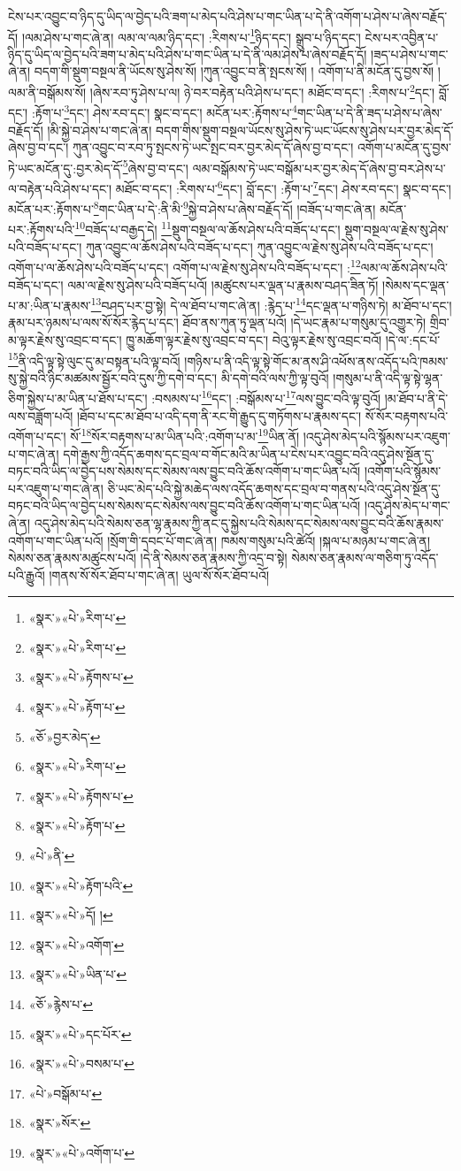 ངེས་པར་འབྱུང་བ་ཉིད་དུ་ཡིད་ལ་བྱེད་པའི་ཟག་པ་མེད་པའི་ཤེས་པ་གང་ཡིན་པ་དེ་ནི་འགོག་པ་ཤེས་པ་ཞེས་བརྗོད་དོ། །ལམ་ཤེས་པ་གང་ཞེ་ན། ལམ་ལ་ལམ་ཉིད་དང་། :རིགས་པ་\footnote{«སྣར་»«པེ་»རིག་པ་}ཉིད་དང་། སྒྲུབ་པ་ཉིད་དང་། ངེས་པར་འབྱིན་པ་ཉིད་དུ་ཡིད་ལ་བྱེད་པའི་ཟག་པ་མེད་པའི་ཤེས་པ་གང་ཡིན་པ་དེ་ནི་ལམ་ཤེས་པ་ཞེས་བརྗོད་དོ། །ཟད་པ་ཤེས་པ་གང་ཞེ་ན། བདག་གི་སྡུག་བསྔལ་ནི་ཡོངས་སུ་ཤེས་སོ། །ཀུན་འབྱུང་བ་ནི་སྤངས་སོ། །
འགོག་པ་ནི་མངོན་དུ་བྱས་སོ། །ལམ་ནི་བསྒོམས་སོ། །ཞེས་རབ་ཏུ་ཤེས་པ་ལ། ཉེ་བར་བརྟེན་པའི་ཤེས་པ་དང་། མཐོང་བ་དང་། :རིགས་པ་\footnote{«སྣར་»«པེ་»རིག་པ་}དང་། བློ་དང་། :རྟོག་པ་\footnote{«སྣར་»«པེ་»རྟོགས་པ་}དང་། ཤེས་རབ་དང་། སྣང་བ་དང་། མངོན་པར་:རྟོགས་པ་\footnote{«སྣར་»«པེ་»རྟོག་པ་}གང་ཡིན་པ་དེ་ནི་ཟད་པ་ཤེས་པ་ཞེས་བརྗོད་དོ། །མི་སྐྱེ་བ་ཤེས་པ་གང་ཞེ་ན། བདག་གིས་སྡུག་བསྔལ་ཡོངས་སུ་ཤེས་ཏེ་ཡང་ཡོངས་སུ་ཤེས་པར་བྱར་མེད་དོ་ཞེས་བྱ་བ་དང་། ཀུན་འབྱུང་བ་རབ་ཏུ་སྤངས་ཏེ་ཡང་སྤང་བར་བྱར་མེད་དོ་ཞེས་བྱ་བ་དང་། འགོག་པ་མངོན་དུ་བྱས་ཏེ་ཡང་མངོན་དུ་:བྱར་མེད་དོ་\footnote{«ཅོ་»བྱར་མེད་}ཞེས་བྱ་བ་དང་། ལམ་བསྒོམས་ཏེ་ཡང་བསྒོམ་པར་བྱར་མེད་དོ་ཞེས་བྱ་བར་ཤེས་པ་ལ་བརྟེན་པའི་ཤེས་པ་དང་། མཐོང་བ་དང་། :རིགས་པ་\footnote{«སྣར་»«པེ་»རིག་པ་}དང་། བློ་དང་། :རྟོག་པ་\footnote{«སྣར་»«པེ་»རྟོགས་པ་}དང་། ཤེས་རབ་དང་། སྣང་བ་དང་། མངོན་པར་:རྟོགས་པ་\footnote{«སྣར་»«པེ་»རྟོག་པ་}གང་ཡིན་པ་དེ་:ནི་མི་\footnote{«པེ་»ནི་}སྐྱེ་བ་ཤེས་པ་ཞེས་བརྗོད་དོ། །བཟོད་པ་གང་ཞེ་ན། མངོན་པར་:རྟོགས་པའི་\footnote{«སྣར་»«པེ་»རྟོག་པའི་}བཟོད་པ་བརྒྱད་དེ། \footnote{«སྣར་»«པེ་»དོ། ། }སྡུག་བསྔལ་ལ་ཆོས་ཤེས་པའི་བཟོད་པ་དང་། སྡུག་བསྔལ་ལ་རྗེས་སུ་ཤེས་པའི་བཟོད་པ་དང་། ཀུན་འབྱུང་ལ་ཆོས་ཤེས་པའི་བཟོད་པ་དང་། ཀུན་འབྱུང་ལ་རྗེས་སུ་ཤེས་པའི་བཟོད་པ་དང་། འགོག་པ་ལ་ཆོས་ཤེས་པའི་བཟོད་པ་དང་། འགོག་པ་ལ་རྗེས་སུ་ཤེས་པའི་བཟོད་པ་དང་། :\footnote{«སྣར་»«པེ་»འགོག་}ལམ་ལ་ཆོས་ཤེས་པའི་བཟོད་པ་དང་། ལམ་ལ་རྗེས་སུ་ཤེས་པའི་བཟོད་པའོ། །མཚུངས་པར་ལྡན་པ་རྣམས་བཤད་ཟིན་ཏོ། །སེམས་དང་ལྡན་པ་མ་:ཡིན་པ་རྣམས་\footnote{«སྣར་»«པེ་»ཡིན་པ་}བཤད་པར་བྱ་སྟེ། དེ་ལ་ཐོབ་པ་གང་ཞེ་ན། :རྙེད་པ་\footnote{«ཅོ་»རྙེས་པ་}དང་ལྡན་པ་གཉིས་ཏེ། མ་ཐོབ་པ་དང་། རྣམ་པར་ཉམས་པ་ལས་སོ་སོར་རྙེད་པ་དང་། ཐོབ་ནས་ཀུན་ཏུ་ལྡན་པའོ། །དེ་ཡང་རྣམ་པ་གསུམ་དུ་འགྱུར་ཏེ། གྲིབ་མ་ལྟར་རྗེས་སུ་འབྲང་བ་དང་། ཁྱུ་མཆོག་ལྟར་རྗེས་སུ་འབྲང་བ་དང་། བེའུ་ལྟར་རྗེས་སུ་འབྲང་བའོ། །དེ་ལ་:དང་པོ་\footnote{«སྣར་»«པེ་»དང་པོར་}ནི་འདི་ལྟ་སྟེ་ལུང་དུ་མ་བསྟན་པའི་ལྟ་བའོ། །གཉིས་པ་ནི་འདི་ལྟ་སྟེ་གོང་མ་ནས་ཤི་འཕོས་ནས་འདོད་པའི་ཁམས་སུ་སྐྱེ་བའི་ཉིང་མཚམས་སྦྱོར་བའི་དུས་ཀྱི་དགེ་བ་དང་། མི་དགེ་བའི་ལས་ཀྱི་ལྟ་བུའོ། །གསུམ་པ་ནི་འདི་ལྟ་སྟེ་ལྷན་ཅིག་སྐྱེས་པ་མ་ཡིན་པ་ཐོས་པ་དང་། :བསམས་པ་\footnote{«སྣར་»«པེ་»བསམ་པ་}དང་། :བསྒོམས་པ་\footnote{«པེ་»བསྒོམ་པ་}ལས་བྱུང་བའི་ལྟ་བུའོ། །མ་ཐོབ་པ་ནི་དེ་ལས་བཟློག་པའོ། །ཐོབ་པ་དང་མ་ཐོབ་པ་འདི་དག་ནི་རང་གི་རྒྱུད་དུ་གཏོགས་པ་རྣམས་དང་། སོ་སོར་བརྟགས་པའི་འགོག་པ་དང་། སོ་\footnote{«སྣར་»སོར་}སོར་བརྟགས་པ་མ་ཡིན་པའི་:འགོག་པ་མ་\footnote{«སྣར་»«པེ་»འགོག་པ་}ཡིན་ནོ། །འདུ་ཤེས་མེད་པའི་སྙོམས་པར་འཇུག་པ་གང་ཞེ་ན། དགེ་རྒྱས་ཀྱི་འདོད་ཆགས་དང་བྲལ་བ་གོང་མའི་མ་ཡིན་པ་ངེས་པར་འབྱུང་བའི་འདུ་ཤེས་སྔོན་དུ་བཏང་བའི་ཡིད་ལ་བྱེད་པས་སེམས་དང་སེམས་ལས་བྱུང་བའི་ཆོས་འགོག་པ་གང་ཡིན་པའོ། །འགོག་པའི་སྙོམས་པར་འཇུག་པ་གང་ཞེ་ན། ཅི་ཡང་མེད་པའི་སྐྱེ་མཆེད་ལས་འདོད་ཆགས་དང་བྲལ་བ་གནས་པའི་འདུ་ཤེས་སྔོན་དུ་བཏང་བའི་ཡིད་ལ་བྱེད་པས་སེམས་དང་སེམས་ལས་བྱུང་བའི་ཆོས་འགོག་པ་གང་ཡིན་པའོ། །འདུ་ཤེས་མེད་པ་གང་ཞེ་ན། འདུ་ཤེས་མེད་པའི་སེམས་ཅན་ལྷ་རྣམས་ཀྱི་ནང་དུ་སྐྱེས་པའི་སེམས་དང་སེམས་ལས་བྱུང་བའི་ཆོས་རྣམས་འགོག་པ་གང་ཡིན་པའོ། །སྲོག་གི་དབང་པོ་གང་ཞེ་ན། ཁམས་གསུམ་པའི་ཚེའོ། །སྐལ་པ་མཉམ་པ་གང་ཞེ་ན། སེམས་ཅན་རྣམས་མཚུངས་པའོ། །དེ་ནི་སེམས་ཅན་རྣམས་ཀྱི་འདྲ་བ་སྟེ། སེམས་ཅན་རྣམས་ལ་གཅིག་ཏུ་འདོད་པའི་རྒྱུའོ། །གནས་སོ་སོར་ཐོབ་པ་གང་ཞེ་ན། ཡུལ་སོ་སོར་ཐོབ་པའོ། 